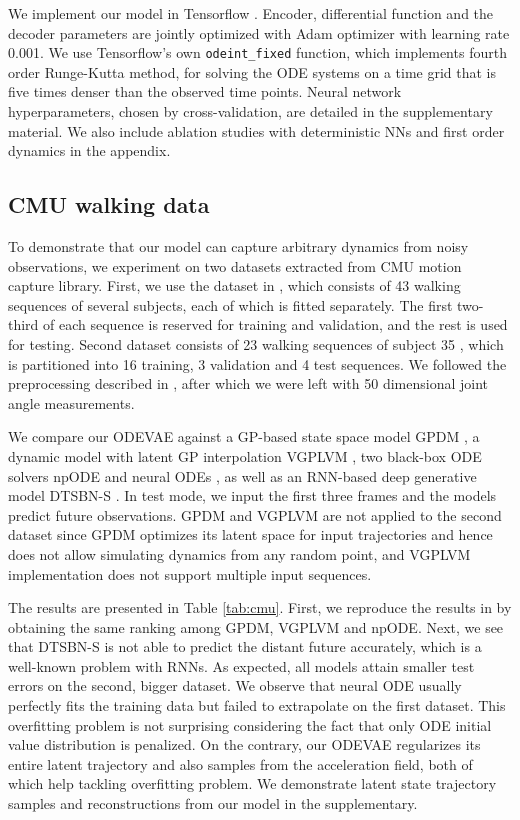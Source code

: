 \documentclass{article}
\newcommand{\0}{\mathbf{0}}
\begin{document}
We implement our model in Tensorflow \citep{abadi2016}. Encoder, differential function and the decoder parameters are jointly optimized with Adam optimizer \citep{kingma2014adam} with learning rate 0.001. We use Tensorflow's own \texttt{odeint\_fixed} function, which implements fourth order Runge-Kutta method, for solving the ODE systems on a time grid that is five times denser than the observed time points. Neural network hyperparameters, chosen by cross-validation, are detailed in the supplementary material. We also include ablation studies with deterministic NNs and first order dynamics in the appendix.



\subsection{CMU walking data}
To demonstrate that our model can capture arbitrary dynamics from noisy observations, we experiment on two datasets extracted from CMU motion capture library. First, we use the dataset in \cite{heinonen18a}, which consists of 43 walking sequences of several subjects, each of which is fitted separately. The first two-third of each sequence is reserved for training and validation, and the rest is used for testing. Second dataset consists of 23 walking sequences of subject 35 \citep{gan2015deep}, which is partitioned into 16 training, 3 validation and 4 test sequences. We followed the preprocessing described in \citet{wang2008gaussian}, after which we were left with 50 dimensional joint angle measurements. 



We compare our ODEVAE against a GP-based state space model GPDM \citep{wang2008gaussian}, a dynamic model with latent GP interpolation VGPLVM \citep{damianou2011variational}, two black-box ODE solvers npODE \citep{heinonen18a} and neural ODEs \citep{chen2018neural}, as well as an RNN-based deep generative model DTSBN-S \citep{gan2015deep}. In test mode, we input the first three frames and the models predict future observations. GPDM and VGPLVM are not applied to the second dataset since GPDM optimizes its latent space for input trajectories and hence does not allow simulating dynamics from any random point, and VGPLVM implementation does not support multiple input sequences.

The results are presented in Table \ref{tab:cmu}. First, we reproduce the results in \citet{heinonen18a} by obtaining the same ranking among GPDM, VGPLVM and npODE. Next, we see that DTSBN-S is not able to predict the distant future accurately, which is a well-known problem with RNNs. As expected, all models attain smaller test errors on the second, bigger dataset. We observe that neural ODE usually perfectly fits the training data but failed to extrapolate on the first dataset. This overfitting problem is not surprising considering the fact that only ODE initial value distribution is penalized. On the contrary, our ODEVAE regularizes its entire latent trajectory and also samples from the acceleration field, both of which help tackling overfitting problem. We demonstrate latent state trajectory samples and reconstructions from our model in the supplementary.
\end{document}

